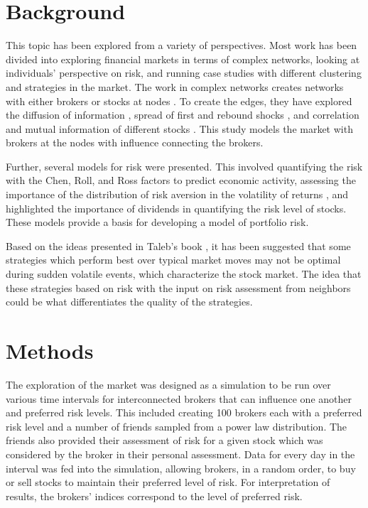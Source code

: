 \documentclass[letterpaper, 10 pt, proceedings]{ieeetran}
\begin{document}
	\section{Background}\label{sec:background}
	This topic has been explored from a variety of perspectives. Most work has been divided into exploring financial markets in terms of complex networks, looking at individuals' perspective on risk, and running case studies with different clustering and strategies in the market. The work in complex networks creates networks with either brokers or stocks at nodes \cite{kulmann_marketscomplexsystems,dimaggio_relevancebrokernetworks}. To create the edges, they have explored the diffusion of information \cite{dimaggio_relevancebrokernetworks}, spread of first and rebound shocks \cite{gai_contagion}, and correlation and mutual information of different stocks \cite{li_correlation, fiedor_networksmutualinformationrate}. This study models the market with brokers at the nodes with influence connecting the brokers. 
	
	Further, several models for risk were presented. This involved quantifying the risk with the Chen, Roll, and Ross factors \cite{cooper_realinvestmentandrisk} to predict economic activity, assessing the importance of the distribution of risk aversion in the volatility of returns \cite{lansing_riskaversion}, and highlighted the importance of dividends in quantifying the risk level of stocks. These models provide a basis for developing a model of portfolio risk.
	
	Based on the ideas presented in Taleb's book \cite{taleb_antifragile}, it has been suggested that some strategies which perform best over typical market moves may not be optimal during sudden volatile events, which characterize the stock market. The idea that these strategies based on risk with the input on risk assessment from neighbors could be what differentiates the quality of the strategies.
	
	
	\section{Methods}\label{sec:methods}
	The exploration of the market was designed as a simulation to be run over various time intervals for interconnected brokers that can influence one another and preferred risk levels. This included creating 100 brokers each with a preferred risk level and a number of friends sampled from a power law distribution. The friends also provided their assessment of risk for a given stock which was considered by the broker in their personal assessment. Data for every day in the interval was fed into the simulation, allowing brokers, in a random order, to buy or sell stocks to maintain their preferred level of risk. For interpretation of results, the brokers' indices correspond to the level of preferred risk. 
	
\end{document}
